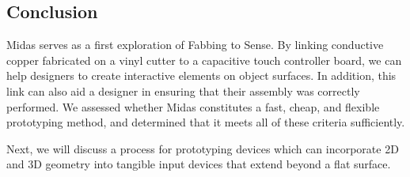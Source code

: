 \subsection{Conclusion}

Midas serves as a first exploration of Fabbing to Sense. By linking conductive copper fabricated on a vinyl cutter to a capacitive touch controller board, we can help designers to create interactive elements on object surfaces. In addition, this link can also aid a designer in ensuring that their assembly was correctly performed. We assessed whether Midas constitutes a fast, cheap, and flexible prototyping method, and determined that it meets all of these criteria sufficiently.

Next, we will discuss a process for prototyping devices which can incorporate 2D and 3D geometry into tangible input devices that extend beyond a flat surface.
